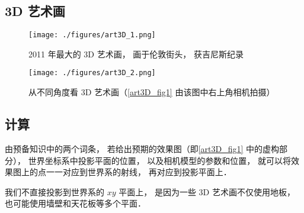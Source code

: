 
\subsection{3D 艺术画}

\begin{figure}[ht]
\centering
\texttt{[image: ./figures/art3D\_1.png]}
\caption{2011 年最大的 3D 艺术画， 画于伦敦街头， 获吉尼斯纪录} \label{art3D_fig1}
\end{figure}

\begin{figure}[ht]
\centering
\texttt{[image: ./figures/art3D\_2.png]}
\caption{从不同角度看 3D 艺术画（\autoref{art3D_fig1} 由该图中右上角相机拍摄）} \label{art3D_fig2}
\end{figure}

\subsection{计算}


由预备知识中的两个词条， 若给出预期的效果图（即\autoref{art3D_fig1} 中的虚构部分）， 世界坐标系中投影平面的位置， 以及相机模型的参数和位置， 就可以将效果图上的点一一对应到世界系的射线， 再对应到投影平面上．

我们不直接投影到世界系的 $xy$ 平面上， 是因为一些 3D 艺术画不仅使用地板， 也可能使用墙壁和天花板等多个平面．

